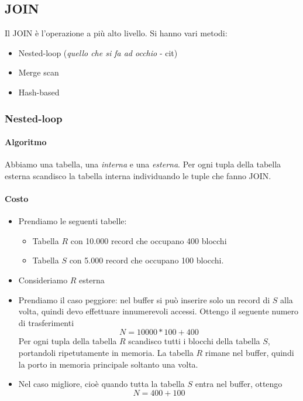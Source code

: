 \subsection{JOIN}
Il JOIN è l'operazione a più alto livello. Si hanno vari metodi:
\begin{itemize}
	\item Nested-loop (\textit{quello che si fa ad occhio} - cit)
	\item Merge scan
	\item Hash-based
\end{itemize}
\subsubsection{Nested-loop}
\paragraph{Algoritmo} Abbiamo una tabella, una \emph{interna} e una \emph{esterna}. Per ogni tupla della tabella esterna scandisco la tabella interna individuando le tuple che fanno JOIN.
\paragraph{Costo} 
\begin{itemize}
	\item Prendiamo le seguenti tabelle:
	\begin{itemize}
		\item Tabella $R$ con 10.000 record che occupano 400 blocchi
		\item Tabella $S$ con 5.000 record che occupano 100 blocchi.
	\end{itemize}
	\item Consideriamo $R$ esterna
	\item Prendiamo il caso peggiore: nel buffer si può inserire solo un record di $S$ alla volta, quindi devo effettuare innumerevoli accessi. Ottengo il seguente numero di trasferimenti
	\[N=10000*100+400\]
	Per ogni tupla della tabella $R$ scandisco tutti i blocchi della tabella $S$, portandoli ripetutamente in memoria. La tabella $R$ rimane nel buffer, quindi la porto in memoria principale soltanto una volta.
	\item Nel caso migliore, cioè quando tutta la tabella $S$ entra nel buffer, ottengo
	\[N=400+100\]
\end{itemize}

